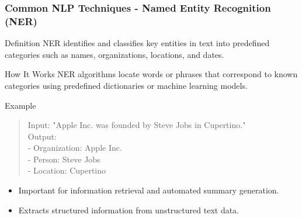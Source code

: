 \documentclass[aspectratio=169]{beamer}
\begin{document}
\begin{frame}[fragile]
    \frametitle{Common NLP Techniques - Named Entity Recognition (NER)}
    
    \begin{block}{Definition}
        NER identifies and classifies key entities in text into predefined categories such as names, organizations, locations, and dates.
    \end{block}
    
    \begin{block}{How It Works}
        NER algorithms locate words or phrases that correspond to known categories using predefined dictionaries or machine learning models.
    \end{block}
    
    \begin{block}{Example}
        \begin{quote}
            Input: "Apple Inc. was founded by Steve Jobs in Cupertino." \\
            Output: \\
            - Organization: Apple Inc. \\
            - Person: Steve Jobs \\
            - Location: Cupertino
        \end{quote}
    \end{block}

    \begin{itemize}
        \item Important for information retrieval and automated summary generation.
        \item Extracts structured information from unstructured text data.
    \end{itemize}
\end{frame}
\end{document}
